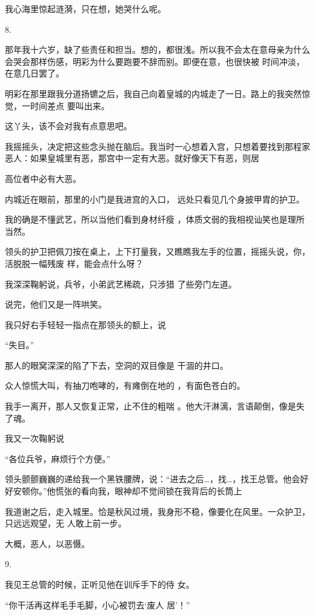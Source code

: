 \documentclass{article}
\begin{document}
我心海里惊起涟漪，只在想，她哭什么呢。 


8. 

那年我十六岁，缺了些责任和担当。想的，都很浅。所以我不会太在意母亲为什么会哭会那样伤感，明彩为什么要跑要不辞而别。即便在意，也很快被
时间冲淡，在意几日罢了。 

明彩在那里跟我分道扬镳之后，我自己向着皇城的内城走了一日。路上的我突然惊觉，一时间差点
要叫出来。 


这丫头，该不会对我有点意思吧。 

我摇摇头，决定把这些念头抛在脑后。我当时一心想着入宫，只想着要找到那程家恶人：如果皇城里有恶，那宫中一定有大恶。就好像天下有恶，则居
\newpage

高位者中必有大恶。 

内城近在眼前，那里的小门是我进宫的入口，
远处只看见几个身披甲胄的护卫。 

我的确是不懂武艺，所以当他们看到身材纤瘦
，体质文弱的我相视讪笑也是理所当然。 

领头的护卫把佩刀按在桌上，上下打量我，又瞧瞧我左手的位置，摇摇头说，你，活脱脱一幅残废
样，能会点什么呀？ 

我深深鞠躬说，兵爷，小弟武艺稀疏，只涉猎
了些旁门左道。 


说完，他们又是一阵哄笑。 


我只好右手轻轻一指点在那领头的额上，说 


“失目。” 

\newpage

那人的眼窝深深的陷了下去，空洞的双目像是
干涸的井口。 

众人惊慌大叫，有抽刀咆哮的，有瘫倒在地的
，有面色苍白的。 

我手一离开，那人又恢复正常，止不住的粗喘
。他大汗淋漓，言语颠倒，像是失了魂。 


我又一次鞠躬说 


“各位兵爷，麻烦行个方便。” 

领头颤颤巍巍的递给我一个黑铁腰牌，说：“进去之后…，找…，找王总管。他会好好安顿你。”他慌张的看向我，眼神却不觉间锁在我背后的长筒上

我道谢之后，走入城里。恰是秋风过境，我身形不稳，像要化在风里。一众护卫，只远远观望，无
人敢上前一步。 

\newpage


大概，恶人，以恶慑。 


9. 

我见王总管的时候，正听见他在训斥手下的侍
女。 

“你干活再这样毛手毛脚，小心被罚去‘废人
居’！” 
\end{document}
